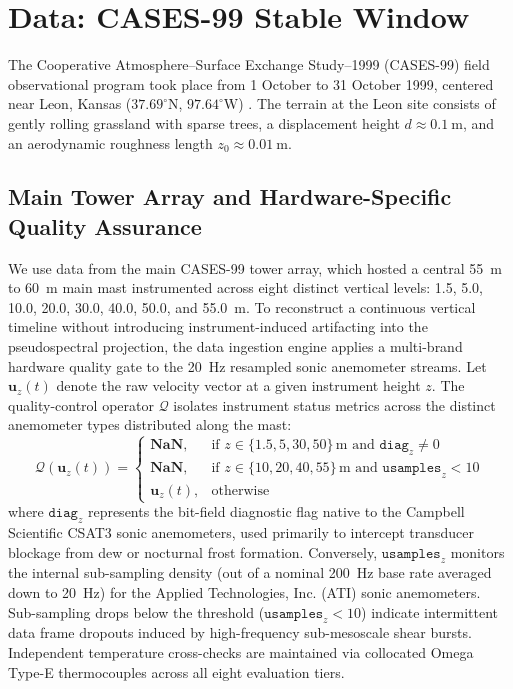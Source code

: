 \section{Data: CASES-99 Stable Window}
\label{sec:data}

The Cooperative Atmosphere--Surface Exchange Study--1999 (CASES-99) field observational program took place from 1 October to 31 October 1999, centered near Leon, Kansas ($37.69^\circ\text{N}$, $97.64^\circ\text{W}$) \citep{Poulos2002}. The terrain at the Leon site consists of gently rolling grassland with sparse trees, a displacement height $d \approx \SI{0.1}{\meter}$, and an aerodynamic roughness length $z_0 \approx \SI{0.01}{\meter}$.

\subsection{Main Tower Array and Hardware-Specific Quality Assurance}
We use data from the main CASES-99 tower array, which hosted a central \SI{55}{\meter} to \SI{60}{\meter} main mast instrumented across eight distinct vertical levels: 1.5, 5.0, 10.0, 20.0, 30.0, 40.0, 50.0, and \SI{55.0}{\meter}. To reconstruct a continuous vertical timeline without introducing instrument-induced artifacting into the pseudospectral projection, the data ingestion engine applies a multi-brand hardware quality gate to the \SI{20}{\hertz} resampled sonic anemometer streams. Let $\mathbf{u}_z(t)$ denote the raw velocity vector at a given instrument height $z$. The quality-control operator $\mathcal{Q}$ isolates instrument status metrics across the distinct anemometer types distributed along the mast:
\begin{equation}
\mathcal{Q}\left(\mathbf{u}_z(t)\right) =
\begin{cases}
\mathbf{NaN}, & \text{if } z \in \{1.5, 5, 30, 50\}\,\si{\meter} \text{ and } \mathtt{diag}_z \neq 0 \\
\mathbf{NaN}, & \text{if } z \in \{10, 20, 40, 55\}\,\si{\meter} \text{ and } \mathtt{usamples}_z < 10 \\
\mathbf{u}_z(t), & \text{otherwise}
\end{cases}
\end{equation}
where $\mathtt{diag}_z$ represents the bit-field diagnostic flag native to the Campbell Scientific CSAT3 sonic anemometers, used primarily to intercept transducer blockage from dew or nocturnal frost formation. Conversely, $\mathtt{usamples}_z$ monitors the internal sub-sampling density (out of a nominal \SI{200}{\hertz} base rate averaged down to \SI{20}{\hertz}) for the Applied Technologies, Inc. (ATI) sonic anemometers. Sub-sampling drops below the threshold ($\mathtt{usamples}_z < 10$) indicate intermittent data frame dropouts induced by high-frequency sub-mesoscale shear bursts. Independent temperature cross-checks are maintained via collocated Omega Type-E thermocouples across all eight evaluation tiers.

